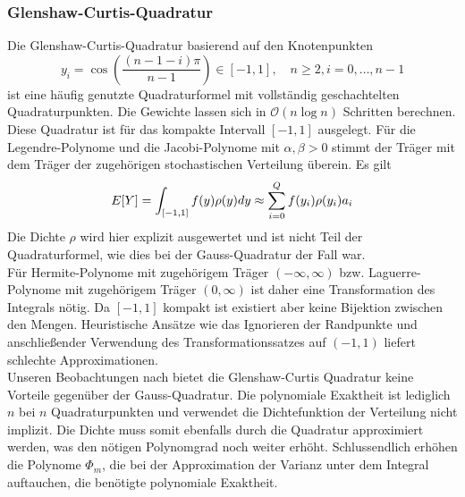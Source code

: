 \subsubsection*{Glenshaw-Curtis-Quadratur}
Die Glenshaw-Curtis-Quadratur basierend auf den Knotenpunkten 
\[y_i=\cos\left(\frac{(n-1-i)\pi}{n-1}\right)\in[-1,1],\quad n\ge 2, i=0,\dots,n-1\]
ist eine häufig genutzte Quadraturformel mit vollständig geschachtelten Quadraturpunkten. Die Gewichte lassen sich in $\mathcal{O}(n\log n)$ Schritten berechnen.\\
Diese Quadratur ist für das kompakte Intervall $[-1,1]$ ausgelegt. Für die Legendre-Polynome und die Jacobi-Polynome mit $\alpha,\beta>0$ stimmt der Träger mit dem Träger der zugehörigen stochastischen Verteilung überein. Es gilt
\[\\E[Y]=\int_{[-1,1]}f(y)\rho(y)dy\approx\sum_{i=0}^Qf(y_i)\rho(y_i)a_i\]
Die Dichte $\rho$ wird hier explizit ausgewertet und ist nicht Teil der Quadraturformel, wie dies bei der Gauss-Quadratur der Fall war.\\
Für Hermite-Polynome mit zugehörigem Träger $(-\infty,\infty)$ bzw. Laguerre-Polynome mit zugehörigem Träger $(0,\infty)$ ist daher eine Transformation des Integrals nötig. Da $[-1,1]$ kompakt ist existiert aber keine Bijektion zwischen den Mengen. Heuristische Ansätze wie das Ignorieren der Randpunkte und anschließender Verwendung des Transformationssatzes auf $(-1,1)$ liefert schlechte Approximationen.\\
Unseren Beobachtungen nach bietet die Glenshaw-Curtis Quadratur keine Vorteile gegenüber der Gauss-Quadratur. Die polynomiale Exaktheit ist lediglich $n$ bei $n$ Quadraturpunkten und verwendet die Dichtefunktion der Verteilung nicht implizit. Die Dichte muss somit ebenfalls durch die Quadratur approximiert werden, was den nötigen Polynomgrad noch weiter erhöht. Schlussendlich erhöhen die Polynome $\Phi_m$, die bei der Approximation der Varianz unter dem Integral auftauchen, die benötigte polynomiale Exaktheit.
